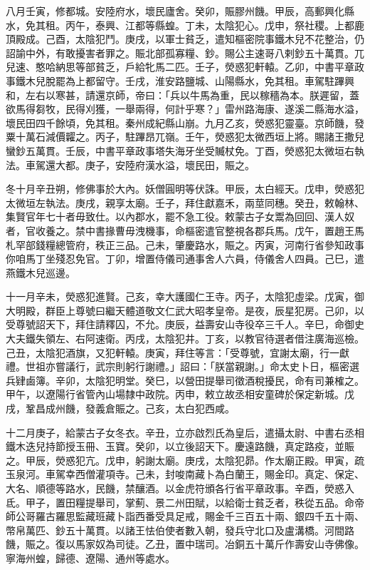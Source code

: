 \begin{pinyinscope}
 八月壬寅，修都城。安陸府水，壞民廬舍。癸卯，賑膠州饑。甲辰，高郵興化縣水，免其租。丙午，泰興、江都等縣蝗。丁未，太陰犯心。戊申，祭社稷。上都鹿頂殿成。己酉，太陰犯鬥。庚戌，以軍士貧乏，遣知樞密院事鐵木兒不花整治，仍詔諭中外，有敢擾害者罪之。賑北部孤寡糧、鈔。賜公主速哥八剌鈔五十萬貫。兀兒速、憨哈納思等部貧乏，戶給牝馬二匹。壬子，熒惑犯軒轅。乙卯，中書平章政事鐵木兒脫罷為上都留守。壬戌，淮安路鹽城、山陽縣水，免其租。車駕駐蹕興和，左右以寒甚，請還京師，帝曰：「兵以牛馬為重，民以稼穡為本。朕遲留，蓋欲馬得芻牧，民得刈獲，一舉兩得，何計乎寒？」雷州路海康、遂溪二縣海水溢，壞民田四千餘頃，免其租。秦州成紀縣山崩。九月乙亥，熒惑犯靈臺。京師饑，發粟十萬石減價糶之。丙子，駐蹕昂兀嶺。壬午，熒惑犯太微西垣上將。賜諸王撒兒蠻鈔五萬貫。壬辰，中書平章政事塔失海牙坐受贓杖免。丁酉，熒惑犯太微垣右執法。車駕還大都。庚子，安陸府漢水溢，壞民田，賑之。



 冬十月辛丑朔，修佛事於大內。妖僧圓明等伏誅。甲辰，太白經天。戊申，熒惑犯太微垣左執法。庚戌，親享太廟。壬子，拜住獻嘉禾，兩莖同穗。癸丑，敕翰林、集賢官年七十者毋致仕。以內郡水，罷不急工役。敕蒙古子女鬻為回回、漢人奴者，官收養之。禁中書掾曹毋洩機事，命樞密遣官整視各郡兵馬。戊午，置趙王馬札罕部錢糧總管府，秩正三品。己未，肇慶路水，賑之。丙寅，河南行省參知政事你咱馬丁坐殘忍免官。丁卯，增置侍儀司通事舍人六員，侍儀舍人四員。己巳，遣燕鐵木兒巡邊。



 十一月辛未，熒惑犯進賢。己亥，幸大護國仁王寺。丙子，太陰犯虛梁。戊寅，御大明殿，群臣上尊號曰繼天體道敬文仁武大昭孝皇帝。是夜，辰星犯房。己卯，以受尊號詔天下，拜住請釋囚，不允。庚辰，益壽安山寺役卒三千人。辛巳，命御史大夫鐵失領左、右阿速衛。丙戌，太陰犯井。丁亥，以教官待選者借注廣海巡檢。己丑，太陰犯酒旗，又犯軒轅。庚寅，拜住等言：「受尊號，宜謝太廟，行一獻禮。世祖亦嘗議行，武宗則躬行謝禮。」詔曰：「朕當親謝。」命太史卜日，樞密選兵肄鹵簿。辛卯，太陰犯明堂。癸巳，以營田提舉司徵酒稅擾民，命有司兼榷之。甲午，以遼陽行省管內山場隸中政院。丙申，敕立故丞相安童碑於保定新城。戊戌，鞏昌成州饑，發義倉賑之。己亥，太白犯西咸。



 十二月庚子，給蒙古子女冬衣。辛丑，立亦啟烈氏為皇后，遣攝太尉、中書右丞相鐵木迭兒持節授玉冊、玉寶。癸卯，以立後詔天下。慶遠路饑，真定路疫，並賑之。甲辰，熒惑犯亢。戊申，躬謝太廟。庚戌，太陰犯昴。作太廟正殿。甲寅，疏玉泉河。車駕幸西僧灌項寺。己未，封唆南藏卜為白蘭王，賜金印。真定、保定、大名、順德等路水，民饑，禁釀酒。以金虎符頒各行省平章政事。辛酉，熒惑入氐。甲子，置田糧提舉司，掌薊、景二州田賦，以給衛士貧乏者，秩從五品。命帝師公哥羅古羅思監藏班藏卜詣西番受具足戒，賜金千三百五十兩、銀四千五十兩、幣帛萬匹、鈔五十萬貫。以諸王怯伯使者數入朝，發兵守北口及盧溝橋。河間路饑，賑之。復以馬家奴為司徒。乙丑，置中瑞司。冶銅五十萬斤作壽安山寺佛像。寧海州蝗，歸德、遼陽、通州等處水。



\end{pinyinscope}